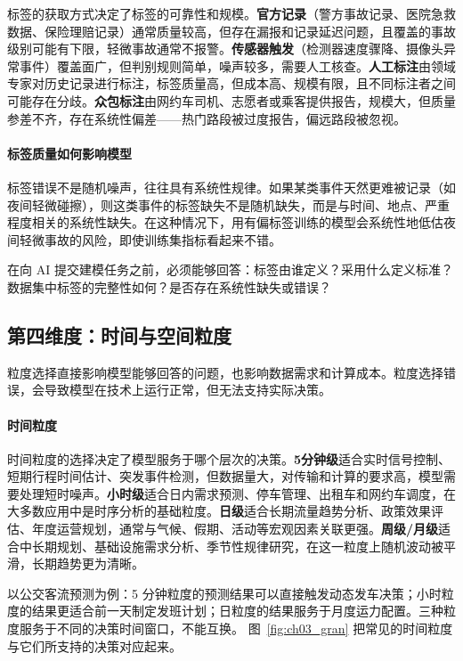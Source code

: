 标签的获取方式决定了标签的可靠性和规模。\textbf{官方记录}（警方事故记录、医院急救数据、保险理赔记录）通常质量较高，但存在漏报和记录延迟问题，且覆盖的事故级别可能有下限，轻微事故通常不报警。\textbf{传感器触发}（检测器速度骤降、摄像头异常事件）覆盖面广，但判别规则简单，噪声较多，需要人工核查。\textbf{人工标注}由领域专家对历史记录进行标注，标签质量高，但成本高、规模有限，且不同标注者之间可能存在分歧。\textbf{众包标注}由网约车司机、志愿者或乘客提供报告，规模大，但质量参差不齐，存在系统性偏差——热门路段被过度报告，偏远路段被忽视。

\paragraph{标签质量如何影响模型}

标签错误不是随机噪声，往往具有系统性规律。如果某类事件天然更难被记录（如夜间轻微碰擦），则这类事件的标签缺失不是随机缺失，而是与时间、地点、严重程度相关的系统性缺失。在这种情况下，用有偏标签训练的模型会系统性地低估夜间轻微事故的风险，即使训练集指标看起来不错。

在向 AI 提交建模任务之前，必须能够回答：标签由谁定义？采用什么定义标准？数据集中标签的完整性如何？是否存在系统性缺失或错误？

\subsection{第四维度：时间与空间粒度}

粒度选择直接影响模型能够回答的问题，也影响数据需求和计算成本。粒度选择错误，会导致模型在技术上运行正常，但无法支持实际决策。

\paragraph{时间粒度}

时间粒度的选择决定了模型服务于哪个层次的决策。\textbf{5分钟级}适合实时信号控制、短期行程时间估计、突发事件检测，但数据量大，对传输和计算的要求高，模型需要处理短时噪声。\textbf{小时级}适合日内需求预测、停车管理、出租车和网约车调度，在大多数应用中是时序分析的基础粒度。\textbf{日级}适合长期流量趋势分析、政策效果评估、年度运营规划，通常与气候、假期、活动等宏观因素关联更强。\textbf{周级/月级}适合中长期规划、基础设施需求分析、季节性规律研究，在这一粒度上随机波动被平滑，长期趋势更为清晰。

以公交客流预测为例：5 分钟粒度的预测结果可以直接触发动态发车决策；小时粒度的结果更适合前一天制定发班计划；日粒度的结果服务于月度运力配置。三种粒度服务于不同的决策时间窗口，不能互换。
图~\ref{fig:ch03_gran} 把常见的时间粒度与它们所支持的决策对应起来。

